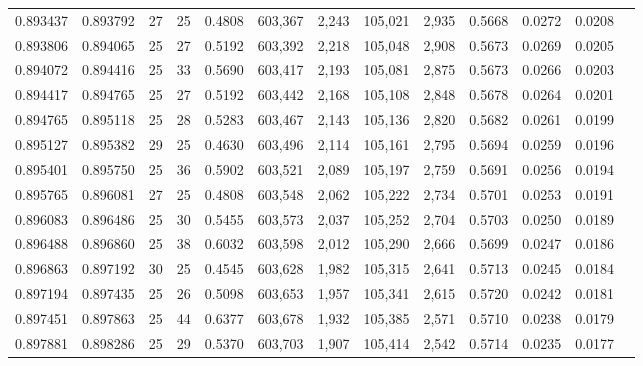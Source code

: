 \begin{tabular}{rrrrrrrrrrrrr}
0.893437 & 0.893792 &    27 &  25 &                                     0.4808 & 603,367 &   2,243 & 105,021 &   2,935 & 0.5668 & 0.0272 & 0.0208 \\
0.893806 & 0.894065 &    25 &  27 &                                     0.5192 & 603,392 &   2,218 & 105,048 &   2,908 & 0.5673 & 0.0269 & 0.0205 \\
0.894072 & 0.894416 &    25 &  33 &                                     0.5690 & 603,417 &   2,193 & 105,081 &   2,875 & 0.5673 & 0.0266 & 0.0203 \\
0.894417 & 0.894765 &    25 &  27 &                                     0.5192 & 603,442 &   2,168 & 105,108 &   2,848 & 0.5678 & 0.0264 & 0.0201 \\
0.894765 & 0.895118 &    25 &  28 &                                     0.5283 & 603,467 &   2,143 & 105,136 &   2,820 & 0.5682 & 0.0261 & 0.0199 \\
0.895127 & 0.895382 &    29 &  25 &                                     0.4630 & 603,496 &   2,114 & 105,161 &   2,795 & 0.5694 & 0.0259 & 0.0196 \\
0.895401 & 0.895750 &    25 &  36 &                                     0.5902 & 603,521 &   2,089 & 105,197 &   2,759 & 0.5691 & 0.0256 & 0.0194 \\
0.895765 & 0.896081 &    27 &  25 &                                     0.4808 & 603,548 &   2,062 & 105,222 &   2,734 & 0.5701 & 0.0253 & 0.0191 \\
0.896083 & 0.896486 &    25 &  30 &                                     0.5455 & 603,573 &   2,037 & 105,252 &   2,704 & 0.5703 & 0.0250 & 0.0189 \\
0.896488 & 0.896860 &    25 &  38 &                                     0.6032 & 603,598 &   2,012 & 105,290 &   2,666 & 0.5699 & 0.0247 & 0.0186 \\
0.896863 & 0.897192 &    30 &  25 &                                     0.4545 & 603,628 &   1,982 & 105,315 &   2,641 & 0.5713 & 0.0245 & 0.0184 \\
0.897194 & 0.897435 &    25 &  26 &                                     0.5098 & 603,653 &   1,957 & 105,341 &   2,615 & 0.5720 & 0.0242 & 0.0181 \\
0.897451 & 0.897863 &    25 &  44 &                                     0.6377 & 603,678 &   1,932 & 105,385 &   2,571 & 0.5710 & 0.0238 & 0.0179 \\
0.897881 & 0.898286 &    25 &  29 &                                     0.5370 & 603,703 &   1,907 & 105,414 &   2,542 & 0.5714 & 0.0235 & 0.0177 \\

\end{tabular}
